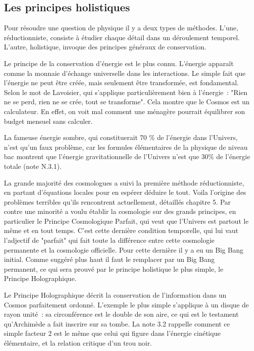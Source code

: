 \documentclass[a4paper,12pt]{article}
\begin{document}
\subsection{Les principes holistiques}

Pour résoudre une question de physique il y a deux types de méthodes. L'une, réductionniste, consiste à étudier chaque détail dans un déroulement temporel. L'autre, holistique, invoque des principes généraux de conservation.

Le principe de la conservation d'énergie est le plus connu. L'énergie apparaît comme la monnaie d'échange universelle dans les interactions. Le simple fait que l'énergie ne peut être créée, mais seulement être transformée, est fondamental. Selon le mot de Lavoisier, qui s'applique particulièrement bien à l'énergie : "Rien ne se perd, rien ne se crée, tout se transforme". Cela montre que le Cosmos est un calculateur.  En effet, on voit mal comment une ménagère pourrait équilibrer son budget mensuel sans calculer.

La fameuse énergie sombre, qui constituerait 70 \% de l'énergie dans l'Univers, n'est qu'un faux problème, car les formules élémentaires de la physique de niveau bac montrent que l'énergie gravitationnelle de l'Univers n'est que 30\% de l'énergie totale (note N.3.1). 

La grande majorité des cosmologues a suivi la première méthode réductionniste, en partant d'équations locales pour en espérer déduire le tout. Voila l'origine des problèmes terribles qu'ils rencontrent actuellement, détaillés chapitre 5. Par contre une minorité a voulu établir la cosmologie sur des grands principes, en particulier le Principe Cosmologique Parfait, qui veut que l'Univers est partout le même et en tout temps. C'est cette dernière condition temporelle, qui lui vaut l'adjectif de "parfait" qui fait toute la différence entre cette cosmologie permanente et la cosmologie officielle. Pour cette dernière il y a eu un Big Bang initial. Comme suggéré plus haut il faut le remplacer par un Big Bang permanent, ce qui sera prouvé par le principe holistique le plus simple, le Principe Holographique.

 Le Principe Holographique décrit la conservation de l'information dans un Cosmos parfaitement ordonné. L'exemple le plus simple s'applique à un disque de rayon unité : sa circonférence est le double de son aire, ce qui est le testament qu'Archimède a fait inscrire sur sa tombe. La note 3.2 rappelle comment ce simple facteur 2 est le même que celui qui figure dans l'énergie cinétique élémentaire, et la relation critique d'un trou noir.
\end{document}
